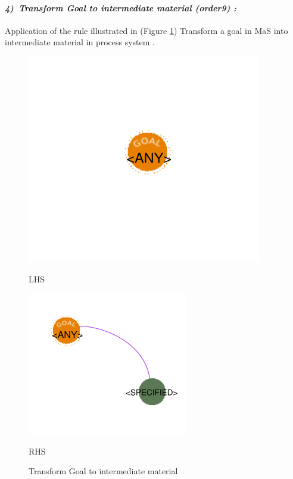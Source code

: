 \paragraph{\emph{4)~Transform Goal to intermediate material (order9) :} }
 
 
Application of the rule illustrated in (Figure \ref{fig:Transform Goal to intermediate material}) Transform a goal in MaS into intermediate material in process system .

\vspace{1cm}
\begin{figure}[th]

\centering
\begin{minipage}{.6\textwidth}
 
  \includegraphics[width=.7\linewidth]{Chapiter3/img/L4}
  \linebreak

\hspace{2.5cm}  LHS
\end{minipage}%
\begin{minipage}{.6\textwidth}
 
  \includegraphics[width=.7\linewidth]{Chapiter3/img/R4}
\linebreak  

\hspace{2.5cm}  RHS 
\end{minipage}
\caption{\label{fig:Transform Goal to intermediate material}Transform Goal to intermediate material}
 
\end{figure}
 
